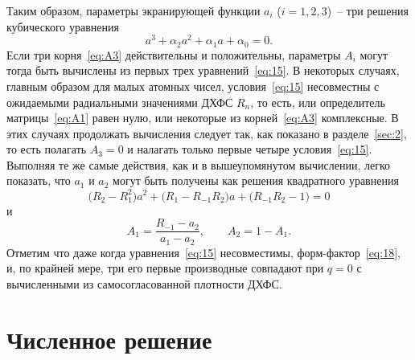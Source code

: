 \documentclass[10pt,pscyr]{hedlab}
\newcommand{\eq}  [1]{\eqref{eq:#1}}
\newcommand{\sect}[1]{\ref{sec:#1}}
\begin{document}
  Таким образом, параметры экранирующей функции \( a_i \) (\( i = 1, 2, 3 \))~--
  три решения кубического уравнения
  \begin{equation}
    a^3 + \alpha_2 a^2 + \alpha_1 a + \alpha_0 = 0.
    \label{eq:A3}
  \end{equation}
  Если три корня~\eq{A3} действительны и положительны, параметры \( A_i \)
  могут тогда быть вычислены из первых трех уравнений~\eq{15}. 
  В некоторых случаях, главным образом для малых атомных чисел,
  условия~\eq{15} несовместны с ожидаемыми радиальными значениями ДХФС
  \( R_n \), то есть, или определитель матрицы~\eq{A1} равен нулю, или
  некоторые из корней~\eq{A3} комплексные. В этих случаях продолжать вычисления
  следует так, как показано в разделе~\sect{2}, то есть полагать \( A_3 = 0 \)
  и налагать только первые четыре условия~\eq{15}. Выполняя те же самые
  действия, как и в вышеупомянутом вычислении, легко показать, что \( a_1 \) и
  \( a_2 \) могут быть получены как решения квадратного уравнения
  \[
    \bigl(R_2 - R_1^2\big) a^2 + \bigl(R_1 - R_{-1}R_2\big)a +
      \bigl(R_{-1} R_2 - 1\big) = 0
  \]
  и
  \[
    A_1 = \frac{R_{-1} - a_2}{a_1 - a_2}, \qquad A_2 = 1 - A_1.
  \]
  Отметим что даже когда уравнения~\eq{15} несовместимы, форм-фактор~\eq{18},
  и, по крайней мере, три его первые производные совпадают при \( q = 0 \) с
  вычисленными из самосогласованной плотности ДХФС.

  \section{Численное решение}
  \label{sec:6}
%  
%  
%  
  
\end{document}
